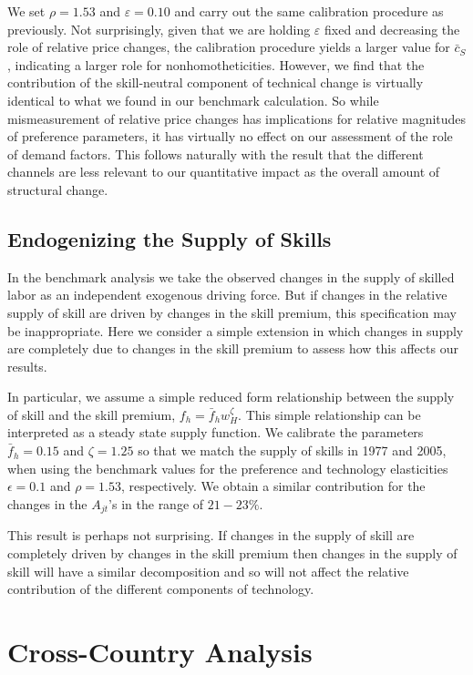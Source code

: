 \documentclass[12pt,english]{article}
\begin{document}
{\normalsize We set $\rho =1.53$ and $\varepsilon =0.10$ and carry out the
same calibration procedure as previously. Not surprisingly, given that we
are holding $\varepsilon $ fixed and decreasing the role of relative price
changes, the calibration procedure yields a larger value for $\bar{c}_{S}$,
indicating a larger role for nonhomotheticities. However, we find that the
contribution of the skill-neutral component of technical change is virtually
identical to what we found in our benchmark calculation. So while
mismeasurement of relative price changes has implications for relative
magnitudes of preference parameters, it has virtually no effect on our
assessment of the role of demand factors. This follows naturally with the
result that the different channels are less relevant to our quantitative
impact as the overall amount of structural change. }

\subsection{Endogenizing the Supply of Skills}

{\normalsize In the benchmark analysis we take the observed changes in the
supply of skilled labor as an independent exogenous driving force. But if
changes in the relative supply of skill are driven by changes in the skill
premium, this specification may be inappropriate. Here we consider a simple
extension in which changes in supply are completely due to changes in the
skill premium to assess how this affects our results. }

{\normalsize In particular, we assume a simple reduced form relationship
between the supply of skill and the skill premium, $f_{h}=\bar{f}%
_{h}w_{H}^{\zeta }$. This simple relationship can be interpreted as a steady
state supply function. We calibrate the parameters $\bar{f}_{h}=0.15$ and $%
\zeta =1.25$ so that we match the supply of skills in 1977 and 2005, when
using the benchmark values for the preference and technology elasticities $%
\epsilon =0.1$ and $\rho =1.53$, respectively. We obtain a similar
contribution for the changes in the $A_{jt}$'s in the range of $21-23\%$. }

{\normalsize This result is perhaps not surprising. If changes in the supply
of skill are completely driven by changes in the skill premium then changes
in the supply of skill will have a similar decomposition and so will not
affect the relative contribution of the different components of technology. }

\section{Cross-Country Analysis}
\end{document}
